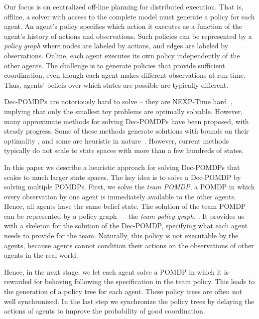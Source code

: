 \documentclass[letterpaper]{article} %
\theoremstyle{definition}
\begin{document}
Our focus is on centralized off-line planning for distributed execution. That is, offline, a solver with access to the complete model must generate a policy for each agent. An agent's policy specifies which action it executes as a function of the agent's history of
actions and observations. Such policies can be represented by a {\em policy graph} where nodes are labeled by actions, and edges are labeled by observations. Online, each agent executes its own policy independently of the other agents.
The challenge is to generate policies that provide sufficient coordination, even though each agent makes different observations at run-time. Thus, agents' beliefs over which states are possible are typically different. 

Dec-POMDPs are notoriously hard to solve -- they are NEXP-Time hard~\cite{DECPOMDPCOMP}, implying that only the smallest toy problems are optimally solvable.
However, many approximate methods for solving Dec-POMDPs have been proposed, with steady progress. Some of these methods generate solutions with bounds on
their optimality \cite{GMAAICE,MBDP,DICEPS}, and some are heuristic in nature~\cite{JESP}. However, current methods typically do not scale to state spaces with more than a few hundreds of states.


In this paper we describe a heuristic approach for solving Dec-POMDPs that scales to much larger state spaces. The key idea is to solve a Dec-POMDP by
solving multiple POMDPs. First, we solve  the {\em team POMDP}, a POMDP in which every observation by one agent is immediately available to the other agents. Hence, all agents have the same belief state.  The solution of the team
POMDP can be represented by a policy graph --- the {\em team policy graph.} . It provides us with a skeleton for the solution of the Dec-POMDP, specifying what each agent needs to provide for the team. Naturally, this policy is not executable by the agents, because agents cannot condition their actions on the observations of other agents in the real world.

Hence, in the next stage, we let each agent solve a POMDP in which it is rewarded for behaving following the specification in the team policy. This leads to the generation of a policy tree for each agent. 
These policy trees are often not well synchronized. In the last step we synchronize the policy trees by delaying the actions of agents to improve the probability of good coordination. 
\end{document}
